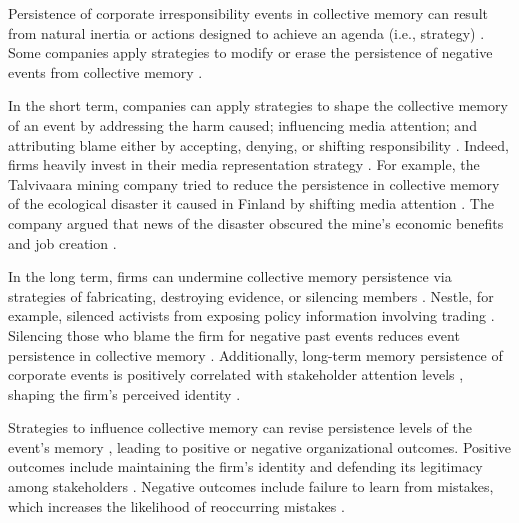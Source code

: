 \documentclass[9pt,twocolumn,twoside,lineno]{pnas-new}
\begin{document}
Persistence of corporate irresponsibility events in collective memory can result from natural inertia or actions designed to achieve an agenda (i.e., strategy) \cite{fine2012sticky}.
Some companies apply strategies to modify or erase the persistence of negative events from collective memory \cite{fine2012sticky, brockmeier2002remembering}.

In the short term, companies can apply strategies to shape the collective memory of an event by addressing the harm caused; influencing media attention; and attributing blame either by accepting, denying, or shifting responsibility \cite{zadek2004civil, mcdonnell2013keeping, storm2012durability}.
Indeed, firms heavily invest in their media representation strategy \cite{desai2014impact}.
For example, the Talvivaara mining company tried to reduce the persistence in collective memory of the ecological disaster it caused in Finland by shifting media attention \cite{mena2016forgetting}.
The company argued that news of the disaster obscured the mine's economic benefits and job creation \cite{mena2016forgetting}.

In the long term, firms can undermine collective memory persistence via strategies of fabricating, destroying evidence, or silencing members \cite{mena2016forgetting,fine2012sticky}.
Nestle, for example, silenced activists from exposing policy information involving trading \cite{mena2016forgetting}.
Silencing those who blame the firm for negative past events reduces event persistence in collective memory \cite{fine2012sticky}.
Additionally, long-term memory persistence of corporate events is positively correlated with stakeholder attention levels \cite{desai2014impact}, shaping the firm's perceived identity \cite{scott2000stakeholder}.

Strategies to influence collective memory can revise persistence levels of the event's memory \cite{mena2016forgetting}, leading to positive or negative organizational outcomes.
Positive outcomes include maintaining the firm's identity and defending its legitimacy among stakeholders \cite{anteby2012collective}.
Negative outcomes include failure to learn from mistakes, which increases the likelihood of reoccurring mistakes \cite{easterby2011praise}.
\end{document}
